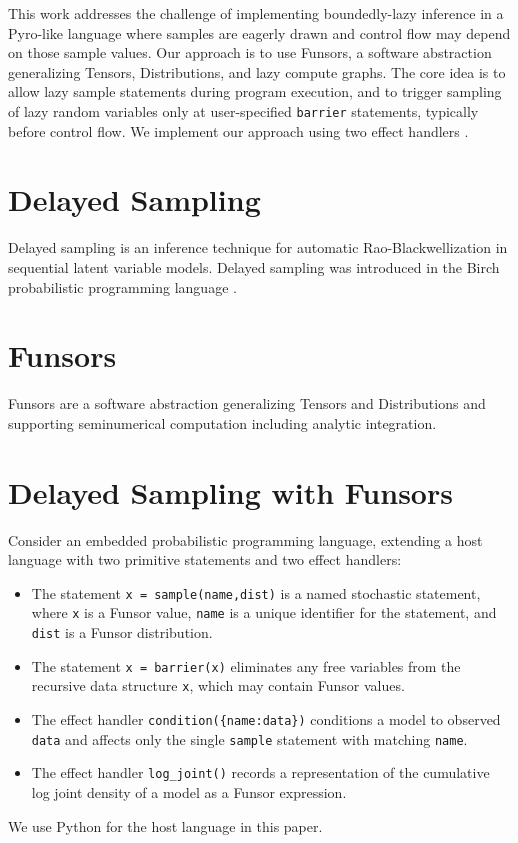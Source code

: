 \documentclass[anonymous=false, %
               format=acmsmall, %
               review=true, %
               screen=true, %
               nonacm=true]{acmart}
\begin{document}
This work addresses the challenge of implementing boundedly-lazy inference in a Pyro-like language where samples are eagerly drawn and control flow may depend on those sample values.
Our approach is to use Funsors, a software abstraction generalizing Tensors, Distributions, and lazy compute graphs.
The core idea is to allow lazy sample statements during program execution, and to trigger sampling of lazy random variables only at user-specified \verb$barrier$ statements, typically before control flow.
We implement our approach using two effect handlers \cite{moore2018effect,pretnar2015introduction}.

\section{Delayed Sampling}

Delayed sampling \cite{murray2017delayed} is an inference technique for automatic Rao-Blackwellization in sequential latent variable models.
Delayed sampling was introduced in the Birch probabilistic programming language \cite{murray2018automated}.

\section{Funsors}

Funsors \cite{obermeyer2019functional} are a software abstraction generalizing Tensors and Distributions and supporting seminumerical computation including analytic integration.

\section{Delayed Sampling with Funsors}

Consider an embedded probabilistic programming language, extending a host language with two primitive statements and two effect handlers:
\begin{itemize}
  \item The statement \verb$x = sample(name,dist)$ is a named stochastic statement, where \verb$x$ is a Funsor value, \verb$name$ is a unique identifier for the statement, and \verb$dist$ is a Funsor distribution.
  \item The statement \verb$x = barrier(x)$ eliminates any free variables from the recursive data structure \verb$x$, which may contain Funsor values.
  \item The effect handler \verb$condition({name:data})$ conditions a model to observed \verb$data$ and affects only the single \verb$sample$ statement with matching \verb$name$.
  \item The effect handler \verb$log_joint()$ records a representation of the cumulative log joint density of a model as a Funsor expression.
\end{itemize}
We use Python for the host language in this paper.
\end{document}
